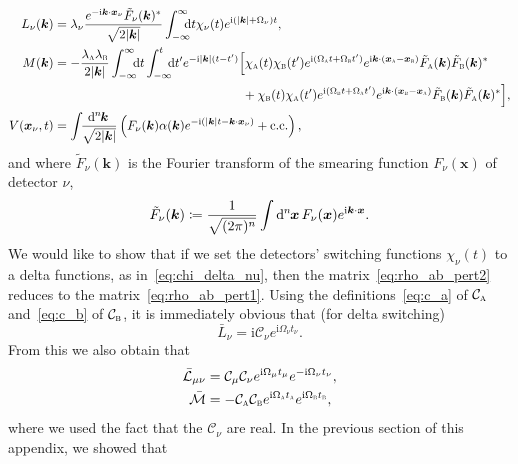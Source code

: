 \documentclass[pra,nofootinbib,floats,aps,twocolumn,tightenlines,superscriptaddress]{revtex4-1}
\renewcommand*\d[2][]{%
	\mathrm{d}%
	\ifx\relax#1\relax\else
	\rule{-0.02em}{1.5ex}^{#1}\rule{0.08em}{0ex}\!
	\fi
	#2\,
}
\newcommand{\ii}{\mathrm{i}}
\newcommand{\ca}{\mathcal{C}_\textsc{a}}
\newcommand{\cb}{\mathcal{C}_\textsc{b}}
\newcommand{\cnu}{\mathcal{C}_\nu}
\newcommand{\cmu}{\mathcal{C}_\mu}
\begin{document}
\begin{align}
	L_\nu(\bm{k})
	&=
	\lambda_\nu\frac{e^{-\ii\bm{k}\cdot\bm{x}_\nu}
	\tilde{F}_\nu(\bm{k})^*}{\sqrt{2|\bm{k}|}}
	\int_{-\infty}^{\infty}\!\!\!\!\dif t \chi_\nu(t)
	e^{\ii(|\bm{k}|+\Omega_\nu)t},
	\\
	\label{eq:M2}
	M(\bm{k})
	&=
	-\frac{\lambda_\textsc{a}\lambda_\textsc{b}}{2|\bm{k}|}
	\int_{-\infty}^{\infty}
	\!\!\!\dif t
	\int_{-\infty}^{t}
	\!\!\!\dif t'
	e^{-\ii|\bm{k}|(t-t')}
	\Big[
	\chi_\textsc{a}(t)
	\chi_\textsc{b}(t')
	e^{\ii(\Omega_\textsc{a}t
	+\Omega_\textsc{b}t')}
	e^{\ii\bm{k}\cdot(\bm{x}_\textsc{a}-\bm{x}_\textsc{b})}
	\tilde{F}_\textsc{a}(\bm k)
	\tilde{F}_\textsc{b}(\bm k)^*
	\notag\\
	&\hspace{15em}+
	\chi_\textsc{b}(t)
	\chi_\textsc{a}(t')
	e^{\ii(\Omega_\textsc{b}t
	+\Omega_\textsc{a}t')}
	e^{\ii\bm{k}\cdot(\bm{x}_\textsc{b}-\bm{x}_\textsc{a})}
	\tilde{F}_\textsc{b}(\bm k)
	\tilde{F}_\textsc{a}(\bm k)^*
	\Big],
	\\
	V(\bm{x}_\nu,t)
	&=
	\int\!\!
	\frac{\d[n]{\bm{k}}}{\sqrt{2|\bm k|}}
	\left(
	F_\nu(\bm k)
	\alpha(\bm k)
	e^{-\ii(|\bm k|t-\bm k\cdot \bm x_\nu)}
	+\text{c.c.}
	\right),
\end{align}
and where $\tilde{F}_\nu(\bm{k})$ is the Fourier transform of the smearing function $F_\nu(\bm{x})$ of detector $\nu$,
\begin{equation}
	\tilde{F}_\nu(\bm{k})
	\coloneqq
	\frac{1}{\sqrt{(2\pi)^n}}\int\d[n]{\bm{x}}
	F_\nu(\bm{x})e^{\ii\bm{k}\cdot\bm{x}}.
\end{equation}
We would like to show that if we set the detectors' switching functions $\chi_\nu(t)$ to a delta functions, as in~\eqref{eq:chi_delta_nu}, then the matrix~\eqref{eq:rho_ab_pert2} reduces to the matrix~\eqref{eq:rho_ab_pert1}. Using the definitions~\eqref{eq:c_a} of $\ca$ and~\eqref{eq:c_b} of $\cb$, it is immediately obvious that (for delta switching)
\begin{equation}
    \bar{L}_\nu
    =
    \ii\cnu e^{\ii\Omega_\nu t_\nu}.
\end{equation}
From this we also obtain that
\begin{align}
    \bar{\mathcal{L}}_{\mu\nu}
    &=
    \cmu \cnu
    e^{\ii\Omega_\mu t_\mu}
    e^{-\ii\Omega_\nu t_\nu},
    \\
    \bar{\mathcal{M}}
    &=
    -\ca \cb
    e^{\ii\Omega_\textsc{a} t_\textsc{a}}
    e^{\ii\Omega_\textsc{b} t_\textsc{b}},
\end{align}
where we used the fact that the $\cnu$ are real. In the previous section of this appendix, we showed that
\end{document}
